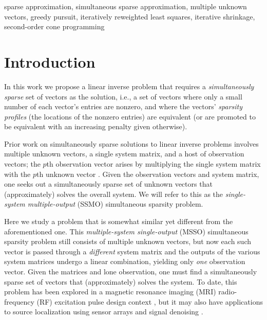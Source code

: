 \documentclass[final]{siamltex}
\begin{document}
\begin{keywords} 
sparse approximation, simultaneous sparse approximation, multiple
unknown vectors, greedy pursuit, iteratively reweighted least
squares, iterative shrinkage, second-order cone programming
\end{keywords}

\pagestyle{myheadings}
\thispagestyle{plain}

\section{Introduction}
\label{sec:introduction}

  In this work we propose a linear inverse problem that requires a
  {\em{simultaneously sparse}} set of vectors as the solution, i.e., a
  set of vectors where only a small number of each vector's entries
  are nonzero, and where the vectors' {\em{sparsity profiles}} (the
  locations of the nonzero entries) are equivalent (or are promoted to
  be equivalent with an increasing penalty given otherwise).

  Prior work on simultaneously sparse solutions to linear inverse
  problems involves multiple unknown vectors, a single system matrix,
  and a host of observation vectors; the $p$th observation vector
  arises by multiplying the single system matrix with the $p$th
  unknown vector \cite{Cot2005,Mal2005,Tro2006_I,Tro2006_II}.  Given
  the observation vectors and system matrix, one seeks out a
  simultaneously sparse set of unknown vectors that (approximately)
  solves the overall system.  We will refer to this as the
  {\em{single-system multiple-output}} (SSMO) simultaneous sparsity
  problem.

  Here we study a problem that is somewhat similar yet
  different from the aforementioned one.  This {\em{multiple-system
  single-output}} (MSSO) simultaneous sparsity problem still consists
  of multiple unknown vectors, but now each such vector is passed
  through a {\em{different}} system matrix and the outputs of the
  various system matrices undergo a linear combination, yielding only
  {\em{one}} observation vector.  Given the matrices and lone
  observation, one must find a simultaneously sparse set of vectors
  that (approximately) solves the system.  To date, this problem has
  been explored in a magnetic resonance imaging (MRI) radio-frequency
  (RF) excitation pulse design context
  \cite{Zel2007,Zel2008_CISS,Zel2008_TMI}, but it may also have
  applications to source localization using sensor arrays
  \cite{Joh1993, Kri1996} and signal denoising
  \cite{Don1995,Che1998,Fle2006,Ela2006}.
\end{document}
